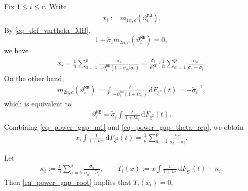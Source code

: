 \documentclass[12pt]{article}
\theoremstyle{plain}
\numberwithin{equation}{section}
\begin{document}
Fix $1\le i\le r$. Write
\begin{align*}
	x_i:=m_{1n,c}(\vartheta_i^{\mathtt{MB}}).
\end{align*}
By \eqref{eq_def_vartheta_MB},
\[
1+\widetilde{\sigma}_i m_{2n,c}(\vartheta_i^{\mathtt{MB}})=0,
\]
we have
\begin{align}\label{eq_power_gap_m1}
	x_i
	=
	\frac{1}{n}\sum_{a=1}^p\frac{\sigma_a}{-\vartheta_i^{\mathtt{MB}}(1-\sigma_a/\widetilde{\sigma}_i)}
	=
	\frac{\widetilde{\sigma}_i}{\vartheta_i^{\mathtt{MB}}}\cdot
	\frac{1}{n}\sum_{a=1}^p\frac{\sigma_a}{\sigma_a-\widetilde{\sigma}_i}.
\end{align}
On the other hand,
\begin{align}\label{eq_power_gap_m2}
	m_{2n,c}(\vartheta_i^{\mathtt{MB}})
	=
	\int\frac{t}{-\vartheta_i^{\mathtt{MB}}(1+t x_i)}\,\mathrm{d}F_{\xi^2}(t)
	=
	-\widetilde{\sigma}_i^{-1},
\end{align}
which is equivalent to
\begin{align}\label{eq_power_gap_theta_rep}
	\vartheta_i^{\mathtt{MB}}
	=
	\widetilde{\sigma}_i\int\frac{t}{1+t x_i}\,\mathrm{d}F_{\xi^2}(t).
\end{align}
Combining \eqref{eq_power_gap_m1} and \eqref{eq_power_gap_theta_rep}, we obtain
\begin{align}\label{eq_power_gap_root}
	x_i\int\frac{t}{1+t x_i}\,\mathrm{d}F_{\xi^2}(t)
	=
	\frac{1}{n}\sum_{a=1}^p\frac{\sigma_a}{\sigma_a-\widetilde{\sigma}_i}.
\end{align}

Let
\begin{align*}
	\kappa_i:=\frac{1}{n}\sum_{a=1}^p\frac{\sigma_a}{\sigma_a-\widetilde{\sigma}_i},
	\qquad
	T_i(x):=
	x\int\frac{t}{1+t x}\,\mathrm{d}F_{\xi^2}(t)-\kappa_i.
\end{align*}
Then \eqref{eq_power_gap_root} implies that $T_i(x_i)=0$.
\end{document}
